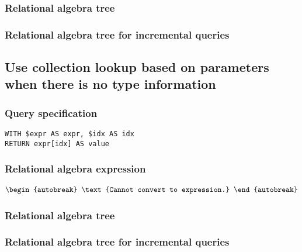 \subsubsection*{Relational algebra tree}


\subsubsection*{Relational algebra tree for incremental queries}


\subsection{Use collection lookup based on parameters when there is no type information}

\subsubsection*{Query specification}

\begin{lstlisting}
WITH $expr AS expr, $idx AS idx
RETURN expr[idx] AS value
\end{lstlisting}

\subsubsection*{Relational algebra expression}

\begin{align*}
\begin{autobreak}
\text{Cannot convert to expression.}
\end{autobreak}
\end{align*}

\subsubsection*{Relational algebra tree}


\subsubsection*{Relational algebra tree for incremental queries}

